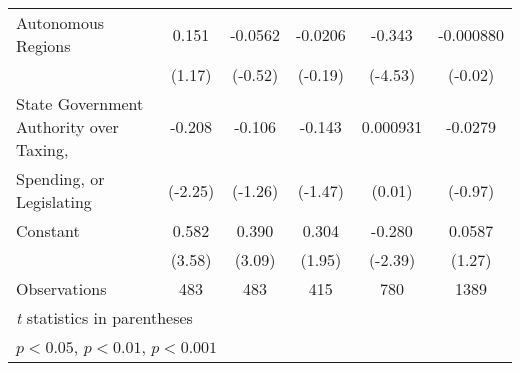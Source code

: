 \begin{table}[htbp]
\begin{tabular}{l*{5}{c}}
Autonomous Regions                      &    0.151         &  -0.0562         &  -0.0206         &   -0.343\sym{***}&-0.000880         \\
                                        &   (1.17)         &  (-0.52)         &  (-0.19)         &  (-4.53)         &  (-0.02)         \\
\addlinespace
State Government Authority over Taxing, &   -0.208\sym{*}  &   -0.106         &   -0.143         & 0.000931         &  -0.0279         \\
Spending, or Legislating                &  (-2.25)         &  (-1.26)         &  (-1.47)         &   (0.01)         &  (-0.97)         \\
\addlinespace
Constant                                &    0.582\sym{***}&    0.390\sym{**} &    0.304         &   -0.280\sym{*}  &   0.0587         \\
                                        &   (3.58)         &   (3.09)         &   (1.95)         &  (-2.39)         &   (1.27)         \\
\midrule
Observations                            &      483         &      483         &      415         &      780         &     1389         \\
\bottomrule
\multicolumn{6}{l}{\footnotesize \textit{t} statistics in parentheses}\\
\multicolumn{6}{l}{\footnotesize \sym{*} \(p<0.05\), \sym{**} \(p<0.01\), \sym{***} \(p<0.001\)}\\
\end{tabular}
\end{table}
